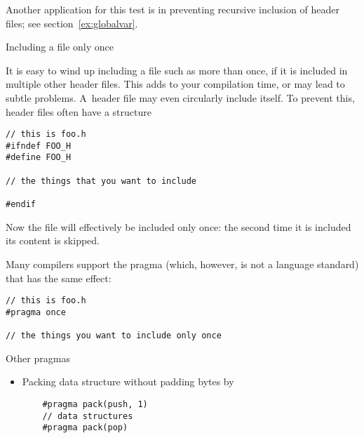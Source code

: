 Another application for this test is in preventing recursive inclusion
of header files; see section~\ref{ex:globalvar}.


 {Including a file only once}

It is easy to wind up including a file such as  more than
once, if it is included in multiple other header files. This adds to
your compilation time, or may lead to subtle problems. A~header file
may even circularly include itself. To prevent this, header files
often have a structure%
\begin{lstlisting}
// this is foo.h
#ifndef FOO_H
#define FOO_H

// the things that you want to include

#endif
\end{lstlisting}
Now the file will effectively be included only once: the second time
it is included its content is skipped.

Many compilers support the pragma
(which, however, is not a language standard) that has the same
effect:
\begin{lstlisting}
// this is foo.h
#pragma once

// the things you want to include only once
\end{lstlisting}

 {Other pragmas}

\begin{itemize}
\item Packing data structure without padding bytes by 
  \begin{lstlisting}
    #pragma pack(push, 1)
    // data structures
    #pragma pack(pop)
  \end{lstlisting}
\end{itemize}
